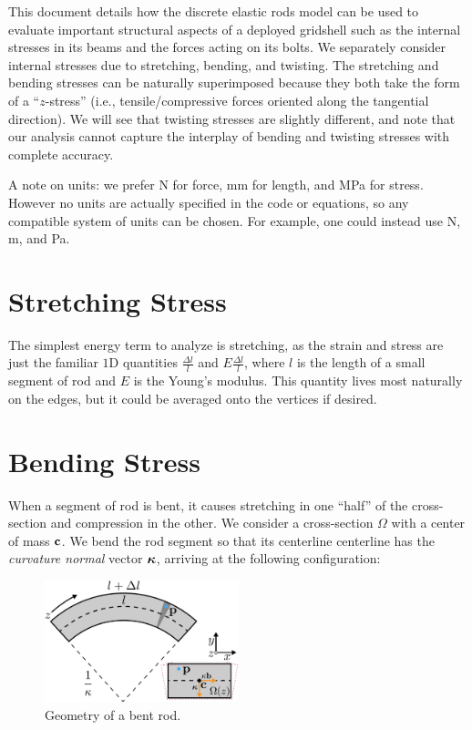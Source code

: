 \documentclass[10pt]{article}
\title{\documenttitle}
\author{Julian Panetta}
\date{\thedate}
\def\mpa{\si{\mega\pascal} }
\def\mm{\si{\milli\meter} }
\begin{document}
\maketitle

This document details how the discrete elastic rods model can be used to
evaluate important structural aspects of a deployed gridshell such as the
internal stresses in its beams and the forces acting on its bolts.
We separately consider internal stresses due to stretching, bending, and twisting.
The stretching and bending stresses can be naturally superimposed because they
both take the form of a ``$z$-stress'' (i.e., tensile/compressive forces oriented
along the tangential direction). We will see that twisting stresses are slightly different,
and note that our analysis cannot capture the interplay of bending and twisting
stresses with complete accuracy.

A note on units: we prefer \si{\newton} for force, \mm for length, and
\mpa for stress. However no units are actually specified in the code or
equations, so any compatible system of units can be chosen. For example, one
could instead use \si{\newton}, \si{\meter}, and \si{\pascal}.

\section{Stretching Stress}
The simplest energy term to analyze is stretching, as the strain and stress are just
the familiar $1$D quantities $\frac{\Delta l}{l}$ and $E \frac{\Delta l}{l}$,
where $l$ is the length of a small segment of rod and $E$ is the Young's modulus.
This quantity lives most naturally on the edges, but it could be averaged onto
the vertices if desired.

\section{Bending Stress}
When a segment of rod is bent, it causes stretching in one ``half'' of the
cross-section and compression in the other. We consider a cross-section $\Omega$
with a center of mass ${\bf c}$. We bend the rod segment so that its centerline
centerline has the \emph{curvature normal} vector $\bm{\kappa}$, arriving at the
following configuration:
\begin{figure}[h]
    \centering
    \includegraphics[width=0.5\textwidth]{BendingFigure.pdf}
    \caption{Geometry of a bent rod.}
    \label{fig:bent_rod}
\end{figure}
\end{document}

